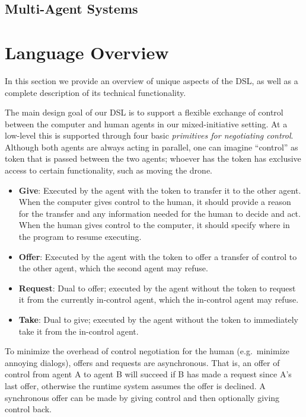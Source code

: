 \documentclass{sig-alternate-05-2015}
\begin{document}
\subsection{Multi-Agent Systems}
\label{sec:intro:mas}

\section{Language Overview}
\label{sec:lang}

In this section we provide an overview of unique aspects of the DSL, as well
as a complete description of its technical functionality.

The main design goal of our DSL is to support a flexible exchange of control
between the computer and human agents in our mixed-initiative setting. At a
low-level this is supported through four basic \emph{primitives for negotiating
control}. Although both agents are always acting in parallel, one can imagine
``control'' as token that is passed between the two agents; whoever has the
token has exclusive access to certain functionality, such as moving the drone.
%
\begin{itemize}
%
\item \textbf{Give}: Executed by the agent with the token to transfer it to the
other agent. When the computer gives control to the human, it should provide a
reason for the transfer and any information needed for the human to decide and
act. When the human gives control to the computer, it should specify where in
the program to resume executing.
%
\item \textbf{Offer}: Executed by the agent with the token to offer a transfer
of control to the other agent, which the second agent may refuse.
%
\item \textbf{Request}: Dual to offer; executed by the agent without the token
to request it from the currently in-control agent, which the in-control agent
may refuse.
%
\item \textbf{Take}: Dual to give; executed by the agent without the token to
immediately take it from the in-control agent.
%
\end{itemize}
%
To minimize the overhead of control negotiation for the human (e.g.\ minimize
annoying dialogs), offers and requests are asynchronous. That is, an offer of
control from agent A to agent B will succeed if B has made a request since A's
last offer, otherwise the runtime system assumes the offer is declined.
%
A synchronous offer can be made by giving control and then optionally giving
control back.
\end{document}
